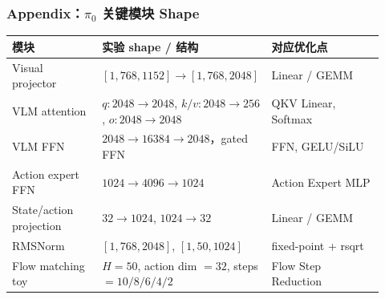 \documentclass[10pt, aspectratio=169]{beamer}
\begin{document}
\begin{frame}
  \frametitle{Appendix：$\pi_0$ 关键模块 Shape}
  \scriptsize
  \begin{table}
    \begin{tabular}{@{}p{0.24\linewidth}p{0.38\linewidth}p{0.30\linewidth}@{}}
      \toprule
      模块                      & 实验 shape / 结构                                                              & 对应优化点               \\
      \midrule
      Visual projector        & $[1,768,1152] \rightarrow [1,768,2048]$                                    & Linear / GEMM       \\
      VLM attention           & $q:2048\rightarrow2048$, $k/v:2048\rightarrow256$, $o:2048\rightarrow2048$ & QKV Linear, Softmax \\
      VLM FFN                 & $2048 \rightarrow 16384 \rightarrow 2048$，gated FFN                        & FFN, GELU/SiLU      \\
      Action expert FFN       & $1024 \rightarrow 4096 \rightarrow 1024$                                   & Action Expert MLP   \\
      State/action projection & $32\rightarrow1024$, $1024\rightarrow32$                                   & Linear / GEMM       \\
      RMSNorm                 & $[1,768,2048]$, $[1,50,1024]$                                              & fixed-point + rsqrt \\
      Flow matching toy       & $H=50$, action dim $=32$, steps $=10/8/6/4/2$                              & Flow Step Reduction \\
      \bottomrule
    \end{tabular}
  \end{table}
\end{frame}
\end{document}
